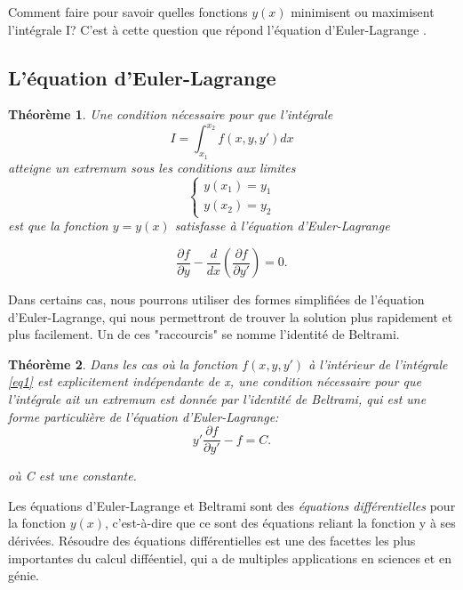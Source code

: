 \documentclass[10pt,a4paper]{article}%
\theoremstyle{theorem}
\newtheorem{theorem}{Théorème}
\theoremstyle{definition}
\begin{document}
	Comment faire pour savoir quelles fonctions $y(x)$ minimisent ou maximisent l'intégrale I? C'est à cette question que répond l'équation d'Euler-Lagrange \cite{euler}.
		 
		\subsection{L'équation d'Euler-Lagrange}\label{EL}
			\begin{theorem}
	  			Une condition nécessaire pour que l'intégrale
	  			\begin{equation}\label{eq1}
		   			I=\int_{x_1}^{x_2} f(x,y,y')dx
		   		\end{equation}
		   		atteigne un extremum sous les conditions aux limites 
		   			\begin{equation}\label{eq2}
		   				\begin{cases}
		   					y(x_1)=y_1
		   					\\
		   					y(x_2)=y_2
		   				\end{cases}
		   			\end{equation}
		    	est que la fonction $y=y(x)$ satisfasse à l'équation d'Euler-Lagrange
		    	
		    		
		  			 \begin{equation}\label{eq3}
		  			 	\frac{\partial f}{\partial y}- \frac{d}{dx}(\frac{\partial f}{\partial y'})=0.
		  			 \end{equation}
				\end{theorem}
	
			Dans certains cas, nous pourrons utiliser des formes simplifiées de l'équation d'Euler-Lagrange, qui nous permettront de trouver la solution plus rapidement et plus facilement. Un de ces "raccourcis" se nomme l'identité de Beltrami.	 
			
				\begin{theorem}\label{thm2}
					 Dans les cas où la fonction $f(x,y,y')$ à l'intérieur de l'intégrale \eqref{eq1} est explicitement indépendante de x, une condition nécessaire pour que l'intégrale ait un extremum est donnée par l'identité de Beltrami, qui est une forme particulière de l'équation d'Euler-Lagrange: 
					 \begin{equation}
					 	y'\frac{\partial f}{\partial y'}-f=C.
					 \end{equation}
					 
					 où C est une constante.
				\end{theorem}
			
			Les équations d'Euler-Lagrange et Beltrami sont des \textit{équations différentielles} pour la fonction $y(x)$, c'est-à-dire que ce sont des équations reliant la fonction y à ses dérivées. Résoudre des équations différentielles est une des facettes les plus importantes du calcul difféentiel, qui a de multiples applications en sciences et en génie.
			
\end{document}
